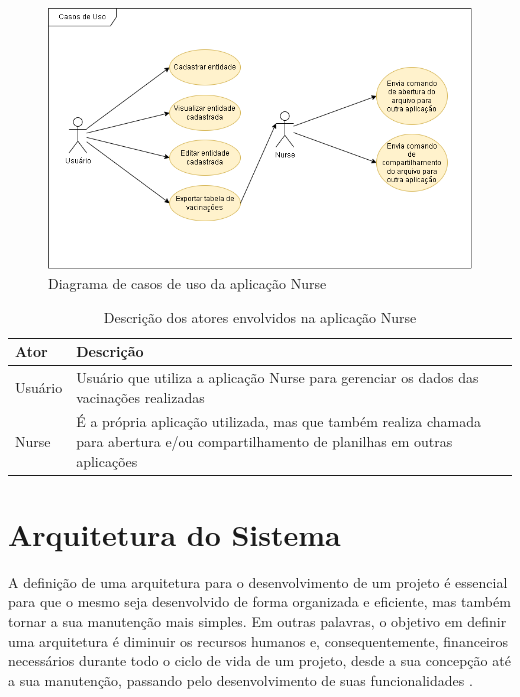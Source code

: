 \begin{figure}[!ht]
  \centering
  \includegraphics[width=\textwidth]{figuras/cap4/4_1_3_use_cases.png}
  \caption{Diagrama de casos de uso da aplicação Nurse}
  \label{fig:casos_de_uso}
\end{figure}

\begin{table}[ht!]
  \centering
  {
  \begin{tabularx}{\textwidth}{
    | >{\centering\arraybackslash}m{} 
    | >{\centering\arraybackslash}X |}
    \hline
    \rowcolor{green!100}
    \textbf{Ator} & \textbf{Descrição} \\ \hline \hline
    Usuário & Usuário que utiliza a aplicação Nurse para gerenciar os dados das vacinações realizadas \\ \hline
    Nurse & É a própria aplicação utilizada, mas que também realiza chamada para abertura e/ou compartilhamento de planilhas em outras aplicações \\ \hline
  \end{tabularx}}
\caption{Descrição dos atores envolvidos na aplicação Nurse}
\label{tab:actors}
\end{table}

\section{Arquitetura do Sistema}
\label{cap4:Sec:ArquiteturaSistema}

A definição de uma arquitetura para o desenvolvimento de um projeto é essencial para que o mesmo seja desenvolvido de forma organizada e eficiente, mas também tornar a sua manutenção mais simples. Em outras palavras, o objetivo em definir uma arquitetura é diminuir os recursos humanos e, consequentemente, financeiros necessários durante todo o ciclo de vida de um projeto, desde a sua concepção até a sua manutenção, passando pelo desenvolvimento de suas funcionalidades \cite{martin2019arquitetura}.


